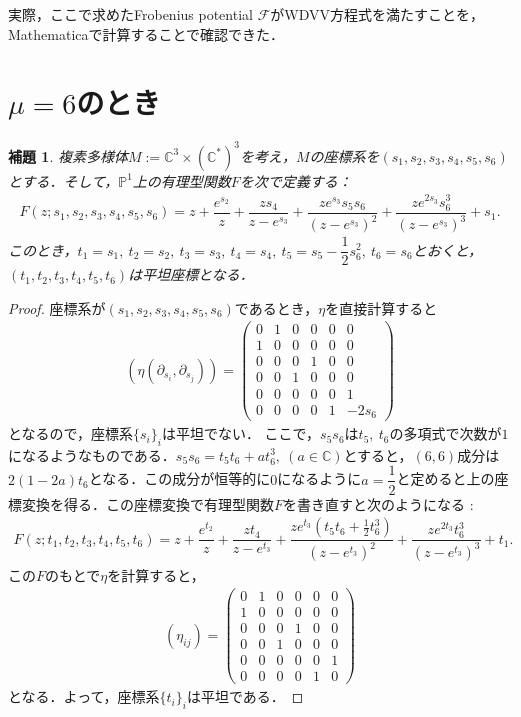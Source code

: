 \documentclass[a4paper,11pt]{jbook}
\theoremstyle{plain}
\newtheorem{lem}[thm]{補題}
\theoremstyle{definition}
\theoremstyle{remark}
\theoremstyle{proof}
\numberwithin{equation}{section}
\def\CC{{\mathbb C}}
\def\PP{{\mathbb P}}
\def\F{{\mathcal F}}
\begin{document}
実際，ここで求めたFrobenius potential $\F$がWDVV方程式を満たすことを，Mathematicaで計算することで確認できた．

\section{$\mu=6$のとき}%
\begin{lem}
複素多様体$M:=\CC^3\times(\CC^*)^3$を考え，$M$の座標系を$(s_1,s_2,s_3,s_4,s_5,s_6)$とする．そして，$\PP^1$上の有理型関数$F$を次で定義する：
\begin{align}F(z;s_1,s_2,s_3,s_4,s_5,s_6)=z+\dfrac{e^{s_2}}{z}+\dfrac{zs_4}{z-e^{s_3}}+\dfrac{ze^{s_3}s_5s_6}{(z-e^{s_3})^2}+\dfrac{ze^{2s_3}s_6^3}{(z-e^{s_3})^3}+s_1.\end{align}
このとき，$t_1=s_1, \ t_2=s_2, \ t_3=s_3, \ t_4=s_4, \ t_5=s_5-\dfrac{1}{2}s_6^2, \ t_6=s_6$とおくと，$(t_1,t_2,t_3,t_4,t_5,t_6)$は平坦座標となる．
\end{lem}
\begin{proof}
座標系が$(s_1,s_2,s_3,s_4,s_5,s_6)$であるとき，$\eta$を直接計算すると
\begin{align}
(\eta(\partial_{s_i},\partial_{s_j}))=
\begin{pmatrix}
0&1&0&0&0&0\\
1&0&0&0&0&0\\
0&0&0&1&0&0\\
0&0&1&0&0&0\\
0&0&0&0&0&1\\
0&0&0&0&1&-2s_6
\end{pmatrix}
\end{align}
となるので，座標系$\{s_i\}_i$は平坦でない．
ここで，$s_5s_6$は$t_5, \ t_6$の多項式で次数が$1$になるようなものである．$s_5s_6=t_5t_6+at_6^3, \ (a \in \CC)$とすると，$(6,6)$成分は$2(1-2a)t_6$となる．この成分が恒等的に$0$になるように$a=\dfrac{1}{2}$と定めると上の座標変換を得る．この座標変換で有理型関数$F$を書き直すと次のようになる : 
\begin{align}
F(z;t_1,t_2,t_3,t_4,t_5,t_6)=z+\dfrac{e^{t_2}}{z}+\dfrac{zt_4}{z-e^{t_3}}+\dfrac{ze^{t_3}(t_5t_6+\frac{1}{2}t_6^3)}{(z-e^{t_3})^2}+\dfrac{ze^{2t_3}t_6^3}{(z-e^{t_3})^3}+t_1.
\end{align}
この$F$のもとで$\eta$を計算すると，
\begin{align}
(\eta_{ij})=
\begin{pmatrix}
0&1&0&0&0&0\\
1&0&0&0&0&0\\
0&0&0&1&0&0\\
0&0&1&0&0&0\\
0&0&0&0&0&1\\
0&0&0&0&1&0
\end{pmatrix}
\end{align}
となる．よって，座標系$\{t_i\}_i$は平坦である．
\end{proof}
\end{document}
